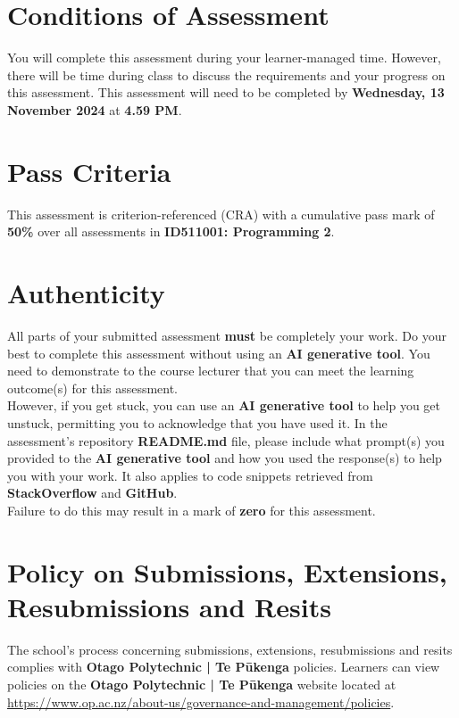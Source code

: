 \documentclass{article}
\begin{document}
\section*{Conditions of Assessment}
You will complete this assessment during your learner-managed time. However, there will be time during class to discuss the requirements and your progress on this assessment. This assessment will need to be completed by \textbf{Wednesday, 13 November 2024} at \textbf{4.59 PM}.

\section*{Pass Criteria}
This assessment is criterion-referenced (CRA) with a cumulative pass mark of \textbf{50\%} over all assessments in \textbf{ID511001: Programming 2}.

\section*{Authenticity}
All parts of your submitted assessment \textbf{must} be completely your work. Do your best to complete this assessment without using an \textbf{AI generative tool}. You need to demonstrate to the course lecturer that you can meet the learning outcome(s) for this assessment. \\
 
 However, if you get stuck, you can use an \textbf{AI generative tool} to help you get unstuck, permitting you to acknowledge that you have used it. In the assessment's repository \textbf{README.md} file, please include what prompt(s) you provided to the \textbf{AI generative tool} and how you used the response(s) to help you with your work. It also applies to code snippets retrieved from \textbf{StackOverflow} and \textbf{GitHub}. \\
 
 Failure to do this may result in a mark of \textbf{zero} for this assessment.

\section*{Policy on Submissions, Extensions, Resubmissions and Resits}
The school's process concerning submissions, extensions, resubmissions and resits complies with \textbf{Otago Polytechnic | Te Pūkenga} policies. Learners can view policies on the \textbf{Otago Polytechnic | Te Pūkenga} website located at \href{https://www.op.ac.nz/about-us/governance-and-management/policies}{https://www.op.ac.nz/about-us/governance-and-management/policies}.
\end{document}
